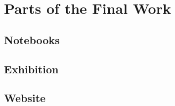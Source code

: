 \lipsum[6-6]


\section{Parts of the Final Work}

\lipsum[2-2]


\subsection{Notebooks}

\lipsum[3-3]


\subsection{Exhibition}

\lipsum[4-4]



\subsection{Website}

\lipsum[5-5]